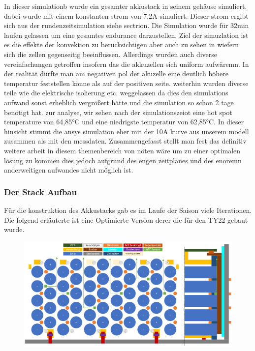 In dieser simulationb wurde ein gesamter akkustack in seinem gehäuse simuliert. dabei wurde mit einem konstanten strom von 7,2A simuliert. Dieser strom ergibt sich aus der rundenzeitsimulation siehe sectrion. Die Simulation wurde für 32min laufen gelassen um eine gesamtes endurance darzustellen. Ziel der simuzlation ist es die effekte der konvektion zu berücksichtigen aber auch zu sehen in wiefern sich die zellen gegenseitig beeinflussen. Allerdings wurden auch diverse vereinfachungen getroffen insofern das die akkuzellen sich uniform aufwäremn. In der realität dürfte man am negativen pol der akuzelle eine deutlich höhere temperatur feststellen könne als auf der positiven seite. weiterhin wurden diverse teile wie die elektrische isolierung etc. weggelassen da dies den simulations aufwand sonst erheblich vergrößert hätte und die simulation so schon 2 tage benötigt hat. zur analyse, wir sehen nach der simulationszeiot eine hot spot temperature von 64,85°C und eine niedrigste temperatur von 62,85°C. In dieser hinsicht stimmt die ansys simulation eher mit der 10A kurve aus unserem modell zusammen als mit den messdaten. Zusammengefasst stellt man fest das definitiv weitere arbeit in diesem themenbereich von nöten wäre um zu einer optimalen lösung zu kommen dies jedoch aufgrund des engen zeitplanes und des enoremn anderweitigen aufwandes nicht möglich ist.
\FloatBarrier

\subsubsection{Der Stack Aufbau} %

Für die konstruktion des Akkustacks gab es im Laufe der Saison viele Iterationen. Die folgend erläuterte ist eine Optimierte Version derer die für den TY22 gebaut wurde.

\begin{figure}
	\centering
	\includegraphics[width=0.7\linewidth]{bilder/Stackaufbau_Prinzipskizze}
	\caption{}
	\label{fig:stackaufbauprinzipskizze}
\end{figure}

